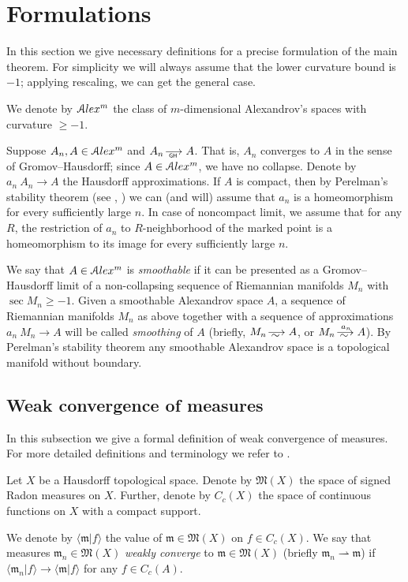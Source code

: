 \section{Formulations}

In this section we give necessary definitions for a precise formulation of the main theorem.
For simplicity  we will always assume that the lower
curvature bound is  $-1$;
applying rescaling, we can get the general case.

We denote by
$\mathcal{A}lex^m$ the class of $m$-dimensional Alexandrov's spaces
with curvature $\ge -1$.

Suppose $A_n, A\in \mathcal{A}lex^m$ and $A_n\GHto A$.
That is, $A_n$ converges to 
$A$ in the sense of Gromov--Hausdorff;
since $A\in \mathcal{A}lex^m$, we have no collapse.
Denote by $a_n\:A_n\to A$ the Hausdorff approximations.
If $A$ is compact, then
by Perelman's stability theorem (see \cite{PerStab}, \cite{KapStab}) we can (and will) assume that $a_n$ is a homeomorphism for every sufficiently large $n$.
In case of noncompact limit, we assume that for any $R$, the restriction of $a_n$ to $R$-neighborhood of the marked point is a homeomorphism to its image for every sufficiently large $n$.

We say that $A\in \mathcal{A}lex^m$ is \emph{smoothable}
if it can be presented as a Gromov--Hausdorff limit of a non-collapsing sequence of Riemannian manifolds $M_n$ with $\sec M_n\ge-1$.
Given a smoothable Alexandrov space $A$,
a sequence of Riemannian manifolds $M_n$ as above
together with a sequence of approximations $a_n\:M_n\to A$
will be called \emph{smoothing} of $A$
(briefly, $M_n\smooths{} A$, or $M_n\smooths{a_n} A$).
By Perelman's stability theorem any smoothable Alexandrov space is a topological manifold without boundary.

\subsection{Weak convergence of measures}

In this subsection we give a formal definition of weak convergence of measures.
For more detailed definitions and terminology we refer to
\cite{GMS}.

Let $X$ be a Hausdorff topological space.
Denote by $\mathfrak M(X)$ the space of signed Radon measures on $X$.
Further, denote by $C_c(X)$  the space of continuous functions on $X$
with a compact support. 

We  denote by $\langle \mathfrak m|f\rangle $ the value of $\mathfrak m\in\mathfrak M(X)$ on $f\in C_c(X)$.
We say that measures $\mathfrak m_n\in \mathfrak M(X)$ \emph{weakly converge} to $\mathfrak m\in \mathfrak M(X)$ (briefly
$\mathfrak m_n\rightharpoonup \mathfrak m$) if $\langle \mathfrak m_n|f\rangle \to \langle \mathfrak m|f\rangle $ for any $f\in C_c(A)$.

